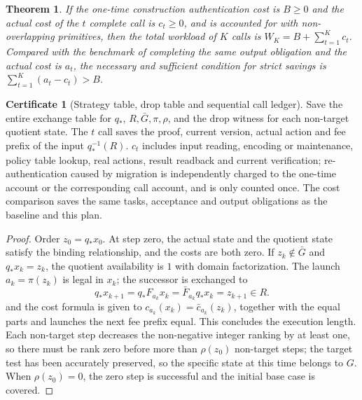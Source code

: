 \documentclass[12pt,a4paper,openany,notitlepage]{report}
\theoremstyle{plain}
\newtheorem{theorem}{Theorem}[chapter]
\theoremstyle{definition}
\newtheorem*{certificate}{Certificate}
\theoremstyle{remark}
\begin{document}
\begin{CJK*}
\begin{theorem}
If the one-time construction authentication cost is $B\ge0$ and the actual cost of the $t$ complete call is $c_t\ge0$, and is accounted for with non-overlapping primitives, then the total workload of $K$ calls is $W_K=B+\sum_{t=1}^Kc_t$. Compared with the benchmark of completing the same output obligation and the actual cost is $a_t$, the necessary and sufficient condition for strict savings is $\sum_{t=1}^K(a_t-c_t)>B$.\end{theorem}
\begin{certificate}
[Strategy table, drop table and sequential call ledger]Save the entire exchange table for $q_*$, $R,\bar G,\pi,\rho$, and the drop witness for each non-target quotient state. The $t$ call saves the proof, current version, actual action and fee prefix of the input $q_*^{-1}(R)$. $c_t$ includes input reading, encoding or maintenance, policy table lookup, real actions, result readback and current verification; re-authentication caused by migration is independently charged to the one-time account or the corresponding call account, and is only counted once. The cost comparison saves the same tasks, acceptance and output obligations as the baseline and this plan.\end{certificate}
\begin{proof}
Order $z_0=q_*x_0$. At step zero, the actual state and the quotient state satisfy the binding relationship, and the costs are both zero. If $z_k\notin\bar G$ and $q_*x_k=z_k$, the quotient availability is $1$ with domain factorization. The launch $a_k=\pi(z_k)$ is legal in $x_k$; the successor is exchanged to \[
 q_*x_{k+1}=q_*F_{a_k}x_k
 =\bar F_{a_k}q_*x_k=z_{k+1}\in R.
\] and the cost formula is given to $c_{a_k}(x_k)=\bar c_{a_k}(z_k)$, together with the equal parts and launches the next fee prefix equal. This concludes the execution length. Each non-target step decreases the non-negative integer ranking by at least one, so there must be rank zero before more than $\rho(z_0)$ non-target steps; the target test has been accurately preserved, so the specific state at this time belongs to $G$. When $\rho(z_0)=0$, the zero step is successful and the initial base case is covered.


\end{proof}
\end{CJK*}
\end{document}

